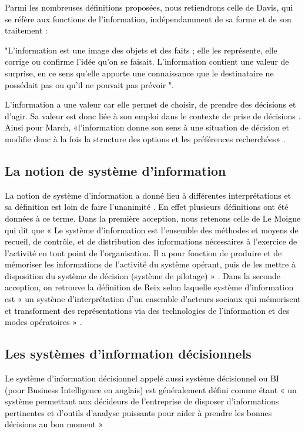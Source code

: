 \documentclass[a4paper,12pt]{report}
\begin{document}
\textcolor{black}{Parmi les nombreuses définitions proposées,  nous retiendrons celle de  Davis,  qui se réfère aux fonctions de l'information, indépendamment de sa forme et de son traitement :}

\textcolor{black}{
		"L’information est une image des objets et des faits ; elle les représente, elle corrige ou confirme l'idée qu'on se faisait. L'information contient une valeur de surprise, en ce sens qu'elle apporte une connaissance que le destinataire ne possédait pas ou qu'il ne pouvait pas prévoir "\citep{davis1986systemes}.
}
	
\textcolor{black}{L'information a une valeur car elle permet  de choisir, de prendre des décisions et d'agir. Sa valeur est donc liée à son emploi dans le contexte de prise de décisions \citep{haouet2008informatique} . 
Ainsi pour March,  «l'information donne son sens à une situation de décision et modifie donc à la fois la structure des options et les préférences recherchées» \citep{march1991systemes}.}

\subsection{La notion de système d’information}
\textcolor{black}{La notion de système d'information a donné lieu à différentes interprétations et sa définition est loin de faire l'unanimité \citep{haouet2008informatique}. En effet plusieurs définitions ont été données à ce terme. Dans la première acception, nous retenons celle de Le Moigne qui dit que «  Le système d’information est l’ensemble des méthodes et moyens de recueil, de contrôle, et de distribution des informations nécessaires à l’exercice de l’activité en tout point de l’organisation. Il a pour fonction de produire et de mémoriser les informations de l’activité   du système opérant, puis de les mettre à disposition du système de décision (système de pilotage) »  \citep{le1977thorie}. Dans la seconde acception, on retrouve la définition de Reix selon laquelle système d’information est  « un  système  d’interprétation d’un ensemble d’acteurs sociaux qui mémorisent et transforment des représentations via des technologies de l’information et des modes opératoires » \citep{reix2002recherche}.}
\subsection{Les systèmes d’information décisionnels}
\textcolor{black}{Le système d’information décisionnel appelé aussi système décisionnel ou BI (pour Business Intelligence en anglais) est généralement défini comme étant « un système permettant aux décideurs de l’entreprise de disposer d’informations pertinentes et d’outils d’analyse puissants pour aider à prendre les bonnes décisions au bon moment » \citep{devisy02livre}}
\end{document}
